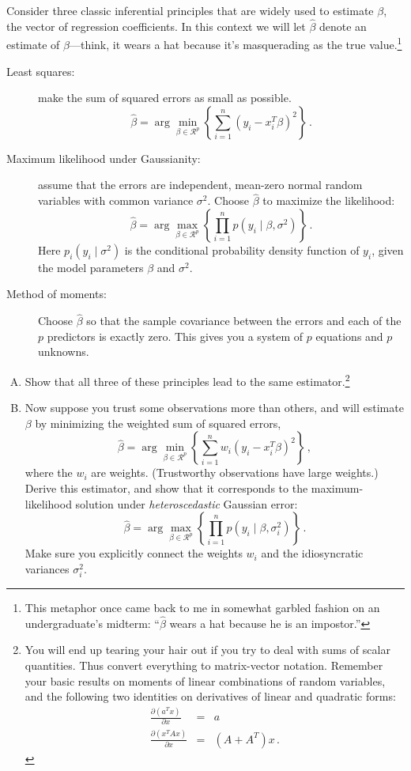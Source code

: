 \documentclass{mynotes}
\begin{document}
Consider three classic inferential principles that are widely used to estimate $\beta$, the vector of regression coefficients.  In this context we will let $\hat{\beta}$ denote an estimate of $\beta$---think, it wears a hat because it's masquerading as the true value.\footnote{This metaphor once came back to me in somewhat garbled fashion on an undergraduate's midterm: ``$\hat{\beta}$ wears a hat because he is an impostor.''}
\begin{description}
\item[Least squares:]make the sum of squared errors as small as possible.
$$
\hat{\beta} = \arg \min_{\beta \in \mathcal{R}^p} \left\{  \sum_{i=1}^n (y_i - x_i^T \beta)^2 \right\}  \, .
$$
\item[Maximum likelihood under Gaussianity:] assume that the errors are independent, mean-zero normal random variables with common variance $\sigma^2$.  Choose $\hat{\beta}$ to maximize the likelihood:
$$
\hat{\beta} = \arg \max_{\beta \in \mathcal{R}^p} \left\{ \prod_{i=1}^n p(y_i \mid \beta, \sigma^2) \right\} \, .
$$
Here $p_i(y_i \mid \sigma^2)$ is the conditional probability density function of $y_i$, given the model parameters $\beta$ and $\sigma^2$.

\item[Method of moments:] Choose $\hat{\beta}$ so that the sample covariance between the errors and each of the $p$ predictors is exactly zero.  This gives you a system of $p$ equations and $p$ unknowns.
\end{description}

\begin{enumerate}[(A)]

\item Show that all three of these principles lead to the same estimator.\footnote{You will end up tearing your hair out if you try to deal with sums of scalar quantities.  Thus convert everything to matrix-vector notation.  Remember your basic results on moments of linear combinations of random variables, and the following two identities on derivatives of linear and quadratic forms:
\begin{eqnarray*}
\frac{\partial (a^Tx)}{\partial x} &=& a \\
\frac{\partial (x^T A x)}{\partial x} &=& (A + A^T) x \, .
\end{eqnarray*}
}

\item Now suppose you trust some observations more than others, and will estimate $\beta$ by minimizing the weighted sum of squared errors,
$$
\hat{\beta} = \arg \min_{\beta \in \mathcal{R}^p} \left\{  \sum_{i=1}^n w_i (y_i - x_i^T \beta)^2 \right\}  \, ,
$$
where the $w_i$ are weights.  (Trustworthy observations have large weights.)  Derive this estimator, and show that it corresponds to the maximum-likelihood solution under \textit{heteroscedastic} Gaussian error:
$$
\hat{\beta} = \arg \max_{\beta \in \mathcal{R}^p} \left\{ \prod_{i=1}^n p(y_i \mid \beta, \sigma_i^2) \right\} \, .
$$
Make sure you explicitly connect the weights $w_i$ and the idiosyncratic variances $\sigma^2_i$.

\end{enumerate}
\end{document}

